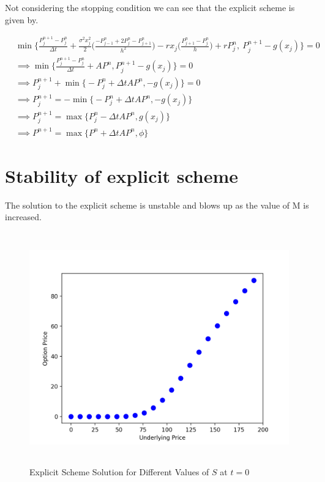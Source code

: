 \documentclass[12pt]{report}
\begin{document}
Not considering the stopping condition we can see that the explicit scheme is given by. 

\begin{equation*}
	\begin{aligned}
		& \min{\bigg\{\frac{P_j^{n+1}-P_j^{n}}{\Delta t}+\frac{\sigma^2x_j^2}{2}\bigg(\frac{-P^n_{j-1}+2P^n_{j}-P^n_{j+1}}{h^2}\bigg)-rx_j\bigg(\frac{P^n_{j+1}-P^n_{j}}{h}\bigg)+rP^n_{j},\ P_j^{n+1}-g(x_j)\bigg\}}=0 \\
	    &\implies \min{\bigg\{\frac{P_j^{n+1}-P_j^{n}}{\Delta t}+AP^n,P_j^{n+1}-g(x_j)\bigg\}}=0 \\
	    &\implies P_j^{n+1}+\min{\bigg\{-P_j^{n}+\Delta tAP^n,-g(x_j)\bigg\}}=0\\
		&\implies P_j^{n+1} = - \min{\bigg\{-P_j^{n}+\Delta tAP^n,-g(x_j)\bigg\}}\\
		&\implies P_j^{n+1} = \max {\bigg\{P_j^{n}-\Delta tAP^n,g(x_j)\bigg\}}\\
		&\implies P^{n+1} = \max{\bigg\{P^{n} + \Delta t AP^{n},\phi \bigg\}}
	\end{aligned}
\end{equation*}

\section*{Stability of explicit scheme}

The solution to the explicit scheme is unstable and blows up as the value of M is increased.  

\begin{figure}[H]
	\centering
	\includegraphics[height=10cm,width=13cm]{Explicit}
	\caption{Explicit Scheme Solution for Different Values of $S$ at $t= 0$}
\end{figure}
\end{document}

